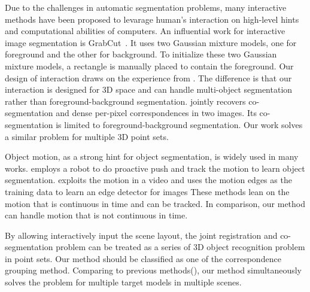 %
Due to the challenges in automatic segmentation problems, many interactive methods have been proposed to levarage human's interaction on high-level hints and computational abilities of computers.
An influential work for interactive image segmentation is GrabCut~\cite{grabcut}. 
It uses two Gaussian mixture models, one for foreground and the other for background. 
To initialize these two Gaussian mixture models, a rectangle is manually placed to contain the foreground. 
Our design of interaction draws on the experience from \cite{grabcut}. 
%
The difference is that our interaction is designed for 3D space and can handle multi-object segmentation rather than foreground-background segmentation. 
%
\cite{Taniai_2016_CVPR} jointly recovers co-segmentation and dense per-pixel correspondences in two images. 
Its co-segmentation is limited to foreground-background segmentation. Our work solves a similar problem for multiple 3D point sets. 

Object motion, as a strong hint for object segmentation, is widely used in many works.
\cite{Xu:2015:ACS:2816795.2818075} employs a robot to do proactive push and track the motion to learn object segmentation. 
\cite{unsupervisededge} exploits the motion in a video and uses the motion edges as the training data to learn an edge detector for images
These methods lean on the motion that is continuous in time and can be tracked. 
In comparison, our method can handle motion that is not continuous in time.

By allowing interactively input the scene layout, the joint registration and co-segmentation problem can be treated as a series of 3D object recognition problem in point sets. 
%
Our method should be classified as one of the correspondence grouping method. 
Comparing to previous methods(\cite{hough,LOF}), our method simultaneously solves the problem for multiple target models in multiple scenes.
